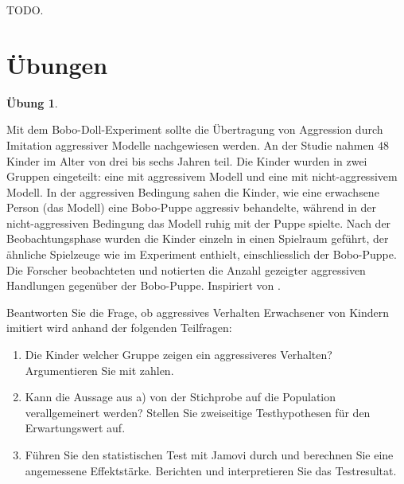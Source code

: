 \documentclass[
]{book}
\providecommand{\tightlist}{%
  \setlength{\itemsep}{0pt}\setlength{\parskip}{0pt}}
\theoremstyle{definition}
\theoremstyle{definition}
\theoremstyle{definition}
\newtheorem{exercise}{Übung}[chapter]
\theoremstyle{definition}
\theoremstyle{remark}
\begin{document}
TODO.

\section{Übungen}\label{uxfcbungen-3}

\begin{exercise}
\protect\hypertarget{exr:bobo2groups}{}\label{exr:bobo2groups}\leavevmode

Mit dem Bobo-Doll-Experiment sollte die Übertragung von Aggression durch Imitation aggressiver Modelle nachgewiesen werden. An der Studie nahmen \(48\) Kinder im Alter von drei bis sechs Jahren teil. Die Kinder wurden in zwei Gruppen eingeteilt: eine mit aggressivem Modell und eine mit nicht-aggressivem Modell. In der aggressiven Bedingung sahen die Kinder, wie eine erwachsene Person (das Modell) eine Bobo-Puppe aggressiv behandelte, während in der nicht-aggressiven Bedingung das Modell ruhig mit der Puppe spielte. Nach der Beobachtungsphase wurden die Kinder einzeln in einen Spielraum geführt, der ähnliche Spielzeuge wie im Experiment enthielt, einschliesslich der Bobo-Puppe. Die Forscher beobachteten und notierten die Anzahl gezeigter aggressiven Handlungen gegenüber der Bobo-Puppe.
Inspiriert von \citet{bandura1961}.

Beantworten Sie die Frage, ob aggressives Verhalten Erwachsener von Kindern imitiert wird anhand der folgenden Teilfragen:

\begin{enumerate}
\def\labelenumi{\alph{enumi})}
\tightlist
\item
  Die Kinder welcher Gruppe zeigen ein aggressiveres Verhalten? Argumentieren Sie mit zahlen.
\item
  Kann die Aussage aus a) von der Stichprobe auf die Population verallgemeinert werden? Stellen Sie zweiseitige Testhypothesen für den Erwartungswert auf.
\item
  Führen Sie den statistischen Test mit Jamovi durch und berechnen Sie eine angemessene Effektstärke. Berichten und interpretieren Sie das Testresultat.
\end{enumerate}

\end{exercise}
\end{document}
